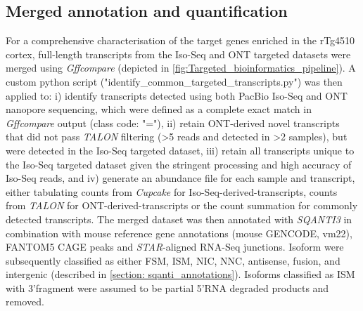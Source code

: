 \subsection{Merged annotation and quantification}
\label{ch6: methods_quantification}
For a comprehensive characterisation of the target genes enriched in the rTg4510 cortex, full-length transcripts from the Iso-Seq and ONT targeted datasets were merged using \textit{Gffcompare} (depicted in \cref{fig:Targeted_bioinformatics_pipeline}). A custom python script ("identify\_common\_targeted\_transcripts.py") was then applied to: i) identify transcripts detected using both PacBio Iso-Seq and ONT nanopore sequencing, which were defined as a complete exact match in \textit{Gffcompare} output (class code: "="), ii) retain ONT-derived novel transcripts that did not pass \textit{TALON} filtering (>5 reads and detected in >2 samples), but were detected in the Iso-Seq targeted dataset, iii) retain all transcripts unique to the Iso-Seq targeted dataset given the stringent processing and high accuracy of Iso-Seq reads, and iv) generate an abundance file for each sample and transcript, either tabulating counts from \textit{Cupcake} for Iso-Seq-derived-transcripts, counts from \textit{TALON} for ONT-derived-transcripts or the count summation for commonly detected transcripts. The merged dataset was then annotated with \textit{SQANTI3} in combination with mouse reference gene annotations (mouse GENCODE, vm22), FANTOM5 CAGE peaks and \textit{STAR}-aligned RNA-Seq junctions. Isoform were subsequently classified as either FSM, ISM, NIC, NNC, antisense, fusion, and intergenic (described in \cref{section: sqanti_annotations}). Isoforms classified as ISM with 3'fragment were assumed to be partial 5'RNA degraded products and removed. 

